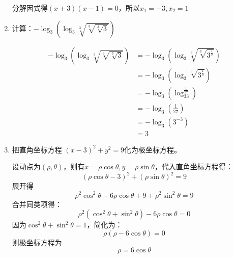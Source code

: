 \documentclass[answers]{exam}
\begin{document}
\begin{questions}
\begin{enumerate}[label=(\arabic*)]
\begin{solution}
			      分解因式得$(x+3)(x-1) = 0$，所以$x_1 = -3, x_2 = 1$
		      \end{solution}
		\item 计算：$-\log_3(\log_3\sqrt[3]{\sqrt[3]{\sqrt[3]{3}}})$
		      \begin{solution}
			      \begin{align*}
				      -\log_3(\log_3\sqrt[3]{\sqrt[3]{\sqrt[3]{3}}}) & = -\log_3(\log_3\sqrt[3]{\sqrt[3]{3^\frac13}}) \\
				                                                     & = -\log_3(\log_3\sqrt[3]{3^\frac19})           \\
				                                                     & = -\log_3(\log_33^\frac1{27})                  \\
				                                                     & = -\log_3\left(\frac{1}{27}\right)             \\
				                                                     & = -\log_3\left(3^{-3}\right)                   \\
				                                                     & = 3
			      \end{align*}
		      \end{solution}
		\item 把直角坐标方程 \( (x-3)^2 + y^2 = 9 \)化为极坐标方程。
		      \begin{solution}
			      设动点为$(\rho, \theta)$，则有$x=\rho\cos\theta, y=\rho\sin\theta$，代入直角坐标方程得：
			      \begin{equation*}
				      (\rho\cos\theta - 3)^2 + (\rho\sin\theta)^2 = 9
			      \end{equation*}
			      展开得
			      \begin{equation*}
				      \rho^2\cos^2\theta - 6\rho\cos\theta + 9 + \rho^2\sin^2\theta = 9
			      \end{equation*}
			      合并同类项得：
			      \begin{equation*}
				      \rho^2(\cos^2\theta + \sin^2\theta) - 6\rho\cos\theta = 0
			      \end{equation*}
			      因为$\cos^2\theta + \sin^2\theta = 1$，简化为：
			      \begin{equation*}
				      \rho(\rho - 6\cos\theta) = 0
			      \end{equation*}
			      则极坐标方程为
			      \begin{equation*}
				      \rho = 6\cos\theta
			      \end{equation*}

\end{solution}
\end{enumerate}
\end{questions}
\end{document}
